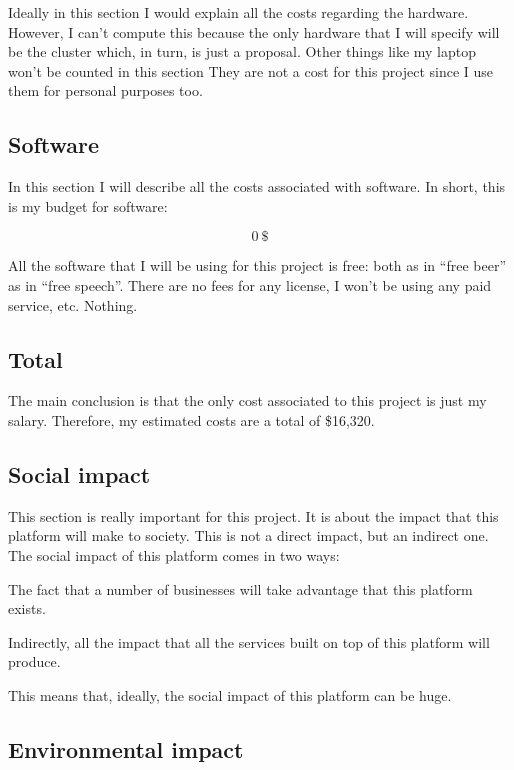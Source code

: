 Ideally in this section I would explain all the costs regarding the hardware.
However, I can't compute this because the only hardware that I will specify will
be the cluster which, in turn, is just a proposal. Other things like my laptop
won't be counted in this section They are not a cost for this project since I
use them for personal purposes too.

\subsection{Software}

In this section I will describe all the costs associated with software. In
short, this is my budget for software:

\[
  0\ \$
\]

All the software that I will be using for this project is free: both as in
``free beer'' as in ``free speech''. There are no fees for any license, I won't
be using any paid service, etc. Nothing.

\subsection{Total}

The main conclusion is that the only cost associated to this project is just my
salary. Therefore, my estimated costs are a total of \$16,320.

\subsection{Social impact}

This section is really important for this project. It is about the impact that
this platform will make to society. This is not a direct impact, but an
indirect one. The social impact of this platform comes in two ways:

\mylist
  \item The fact that a number of businesses will take advantage that this
platform exists.
  \item Indirectly, all the impact that all the services built on top of this
platform will produce.
\mylistend

This means that, ideally, the social impact of this platform can be huge.

\subsection{Environmental impact}

